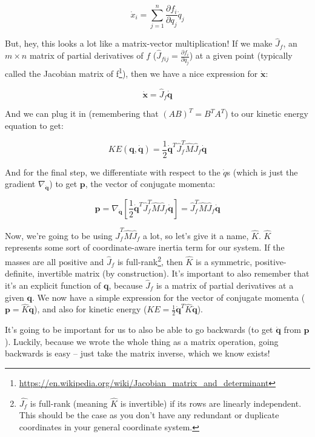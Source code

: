 \documentclass[]{article}
\renewcommand{\href}[2]{#2\footnote{\url{#1}}}
\begin{document}
\[
\dot{x}_i = \sum_{j = 1}^n \frac{\partial f_i}{\partial q_j} \dot{q}_j
\]

But, hey, this looks a lot like a matrix-vector multiplication! If we make
\(\hat{J}_f\), an \(m \times n\) matrix of partial derivatives of \(f\)
(\(\hat{J}_{fij} = \frac{\partial f_i}{\partial q_j}\)) at a given point
(typically called the
\href{https://en.wikipedia.org/wiki/Jacobian_matrix_and_determinant}{Jacobian
matrix of f}), then we have a nice expression for \(\dot{\mathbf{x}}\):

\[
\dot{\mathbf{x}} = \hat{J}_f \dot{\mathbf{q}}
\]

And we can plug it in (remembering that \((A B)^T = B^T A^T\)) to our kinetic
energy equation to get:

\[
KE(\mathbf{q},\dot{\mathbf{q}}) = \frac{1}{2} \dot{\mathbf{q}}^T \hat{J}_f^T
    \hat{M} \hat{J}_f \dot{\mathbf{q}}
\]

And for the final step, we differentiate with respect to the \(\dot{q}\)s (which
is just the gradient \(\nabla_{\dot{\mathbf{q}}}\)) to get \(\mathbf{p}\), the
vector of conjugate momenta:

\[
\mathbf{p} = \nabla_{\dot{\mathbf{q}}} \left[
    \frac{1}{2} \dot{\mathbf{q}}^T \hat{J}_f^T \hat{M} \hat{J}_f \dot{\mathbf{q}}
  \right]
  = \hat{J}_f^T \hat{M} \hat{J}_f \dot{\mathbf{q}}
\]

Now, we're going to be using \(\hat{J}_f^T \hat{M} \hat{J}_f\) a lot, so let's
give it a name, \(\hat{K}\). \(\hat{K}\) represents some sort of
coordinate-aware inertia term for our system. If the masses are all positive and
\(\hat{J}_f\) is full-rank\footnote{\(\hat{J_f}\) is full-rank (meaning
  \(\hat{K}\) is invertible) if its rows are linearly independent. This should
  be the case as you don't have any redundant or duplicate coordinates in your
  general coordinate system.}, then \(\hat{K}\) is a symmetric,
positive-definite, invertible matrix (by construction). It's important to also
remember that it's an explicit function of \(\mathbf{q}\), because \(\hat{J}_f\)
is a matrix of partial derivatives at a given \(\mathbf{q}\). We now have a
simple expression for the vector of conjugate momenta
(\(\mathbf{p} = \hat{K} \dot{\mathbf{q}}\)), and also for kinetic energy
(\(KE = \frac{1}{2} \dot{\mathbf{q}}^T \hat{K}
\dot{\mathbf{q}}\)).

It's going to be important for us to also be able to go backwards (to get
\(\dot{\mathbf{q}}\) from \(\mathbf{p}\)). Luckily, because we wrote the whole
thing as a matrix operation, going backwards is easy -- just take the matrix
inverse, which we know exists!
\end{document}
